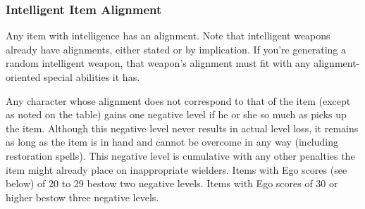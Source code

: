 
\subsubsection{Intelligent Item Alignment}
Any item with intelligence has an alignment. Note that intelligent weapons already have alignments, either stated or by implication. If you're generating a random intelligent weapon, that weapon's alignment must fit with any alignment-oriented special abilities it has.

Any character whose alignment does not correspond to that of the item (except as noted on the table) gains one negative level if he or she so much as picks up the item. Although this negative level never results in actual level loss, it remains as long as the item is in hand and cannot be overcome in any way (including restoration spells). This negative level is cumulative with any other penalties the item might already place on inappropriate wielders. Items with Ego scores (see below) of 20 to 29 bestow two negative levels. Items with Ego scores of 30 or higher bestow three negative levels.
